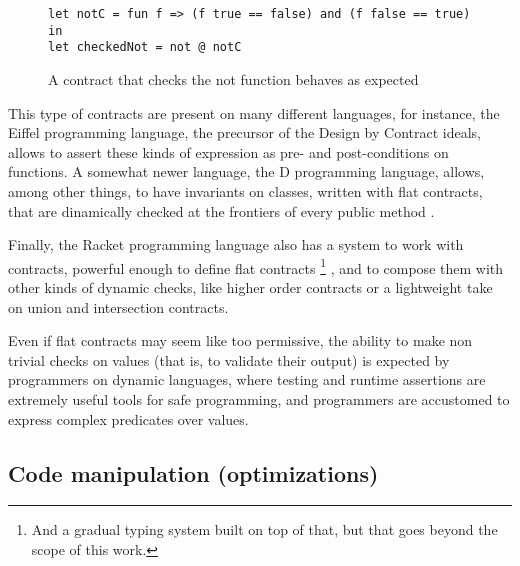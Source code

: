 \documentclass[sigplan,10pt,review,anonymous]{acmart}
\newcommand{\unsure}[2][1=]{}
\newcommand{\info}[2][1=]{}
\begin{document}

\begin{figure}[h]
  \begin{center}
\begin{lstlisting}[language=nickel]
let notC = fun f => (f true == false) and (f false == true) in
let checkedNot = not @ notC
\end{lstlisting}
\end{center}
\caption{A contract that checks the not function behaves as expected}
\label{fig:checked-not}
\end{figure}

This type of contracts are present on many different languages,
for instance, the Eiffel programming language\unsure{Citation?}, the precursor
of the Design by Contract ideals, allows to assert
these kinds of expression as pre- and post-conditions on
functions\cite{EiffelDesignByContract}.
A somewhat newer language, the D programming
language, allows, among other things, to have invariants on
classes\unsure{I (Arnaud) believe Eiffel has this feature as well,
  doesn't it?},
written with flat contracts, that are
dinamically checked at the frontiers of every public method \cite{DLangContracts}.

Finally, the Racket programming language also has a system to work with
contracts, powerful enough to define flat contracts
\footnote{And a gradual typing system
built on top of that, but that goes beyond the scope of this
work.}
, and
to compose them with other kinds of dynamic checks,
like higher order contracts or a lightweight take on union
and intersection contracts\cite{RacketContracts}.

Even if flat contracts may seem like too permissive, the ability to make
non trivial checks on values (that is, to validate their output) is expected
by programmers on dynamic languages, where testing and runtime
assertions are extremely useful tools for safe programming, and
programmers are accustomed to express complex predicates
over values.


\subsection*{Code manipulation (optimizations)}
\label{sec:optimizations}
\info{Present inlining and CSE as two major code
optimizations.
Purity and immutability as two important factors.}
\end{document}
